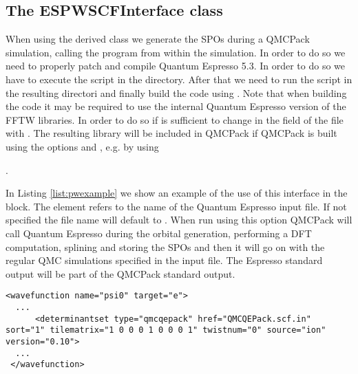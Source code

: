 \subsection{The ESPWSCFInterface class}
When using the  derived class we generate the SPOs during a QMCPack simulation, calling the  program from
within the simulation. In order to do so we need to properly patch and compile Quantum Espresso 5.3. In order to do so we have to execute the 
 script in the  directory. After that we need to run the 
 script in the resulting directori  and finally build the code using . Note that when building the code 
it may be required to use the internal Quantum Espresso version of the FFTW libraries. In order to do so if is sufficient to change in the  field 
of the  file  with . The resulting  library will
 be included in QMCPack if QMCPack is built using the options  and , e.g. by using

.

In Listing \ref{list:pwexample} we show an example of the use of this interface in the  block. The element 
refers to the name of the Quantum Espresso input file. If not specified the file name will default to . When run using this option QMCPack will call Quantum Espresso during the orbital generation, performing a DFT computation, splining and storing the SPOs and then it will go on with the regular QMC simulations specified in the input file. The Espresso standard output will be part of the QMCPack standard output.

\begin{lstlisting}[style=QMCPXML,caption=Example of \ixml{determinantset} block using the PWSCF interface \label{list:pwexample}]
 <wavefunction name="psi0" target="e">
  ...
      <determinantset type="qmcqepack" href="QMCQEPack.scf.in" sort="1" tilematrix="1 0 0 0 1 0 0 0 1" twistnum="0" source="ion" version="0.10">
  ...
 </wavefunction>
\end{lstlisting}
